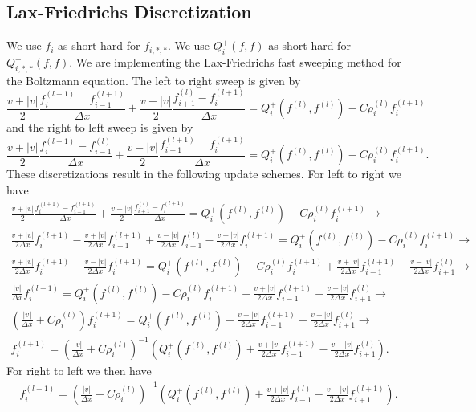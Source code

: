 \documentclass{article}
\begin{document}
\subsection{Lax-Friedrichs Discretization}
We use $f_i$ as short-hard for $f_{i,*,*}$. We use $Q^+_i(f,f)$ as short-hard for $Q^+_{i,*,*}(f,f)$.  We are implementing the Lax-Friedrichs fast sweeping method for the Boltzmann equation. The left to right sweep is given by
\[
  \frac{v + |v|}{2} \frac{f_i^{(l+1)} - f_{i-1}^{(l+1)}}{\Delta x} + \frac{v - |v|}{2} \frac{f_{i+1}^{(l)} - f_{i}^{(l+1)}}{\Delta x} = Q_i^+(f^{(l)}, f^{(l)}) - C \rho_i^{(l)} f_i^{(l+1)}
\]
and the right to left sweep is given by
\[
  \frac{v + |v|}{2} \frac{f_i^{(l+1)} - f_{i-1}^{(l)}}{\Delta x} + \frac{v - |v|}{2} \frac{f_{i+1}^{(l+1)} - f_{i}^{(l+1)}}{\Delta x} = Q_i^+(f^{(l)}, f^{(l)}) - C \rho_i^{(l)} f_i^{(l+1)}.
\]
These discretizations result in the following update schemes. For left to right we have 
\begin{gather*}
  \frac{v + |v|}{2} \frac{f_i^{(l+1)} - f_{i-1}^{(l+1)}}{\Delta x} + \frac{v - |v|}{2} \frac{f_{i+1}^{(l)} - f_{i}^{(l+1)}}{\Delta x} = Q_i^+(f^{(l)}, f^{(l)}) - C \rho_i^{(l)} f_i^{(l+1)} \to \\
  \frac{v + |v|}{2 \Delta x} f_{i}^{(l+1)} - \frac{v + |v|}{2 \Delta x} f_{i-1}^{(l+1)} + \frac{v - |v|}{2 \Delta x} f_{i+1}^{(l)} - \frac{v - |v|}{2 \Delta x} f_{i}^{(l+1)} = Q_i^+(f^{(l)}, f^{(l)}) - C \rho_i^{(l)} f_i^{(l+1)} \to \\
  \frac{v + |v|}{2 \Delta x} f_{i}^{(l+1)} - \frac{v - |v|}{2 \Delta x} f_{i}^{(l+1)} = Q_i^+(f^{(l)}, f^{(l)}) - C \rho_i^{(l)} f_i^{(l+1)} + \frac{v + |v|}{2 \Delta x} f_{i-1}^{(l+1)} - \frac{v - |v|}{2 \Delta x} f_{i+1}^{(l)} \to \\
  \frac{|v|}{\Delta x} f_{i}^{(l+1)} = Q_i^+(f^{(l)}, f^{(l)}) - C \rho_i^{(l)} f_i^{(l+1)} + \frac{v + |v|}{2 \Delta x} f_{i-1}^{(l+1)} - \frac{v - |v|}{2 \Delta x} f_{i+1}^{(l)} \to \\
  \left(\frac{|v|}{\Delta x} + C \rho_i^{(l)} \right) f_{i}^{(l+1)} = Q_i^+(f^{(l)}, f^{(l)}) + \frac{v + |v|}{2 \Delta x} f_{i-1}^{(l+1)} - \frac{v - |v|}{2 \Delta x} f_{i+1}^{(l)} \to \\
  f_{i}^{(l+1)} = \left(\frac{|v|}{\Delta x} + C \rho_i^{(l)} \right)^{-1} \left( Q_i^+(f^{(l)}, f^{(l)}) + \frac{v + |v|}{2 \Delta x} f_{i-1}^{(l+1)} - \frac{v - |v|}{2 \Delta x} f_{i+1}^{(l)} \right).
\end{gather*}
For right to left we then have
\begin{gather*}
  f_{i}^{(l+1)} = \left(\frac{|v|}{\Delta x} + C \rho_i^{(l)} \right)^{-1} \left( Q_i^+(f^{(l)}, f^{(l)}) + \frac{v + |v|}{2 \Delta x} f_{i-1}^{(l)} - \frac{v - |v|}{2 \Delta x} f_{i+1}^{(l+1)} \right).
\end{gather*}
\end{document}
